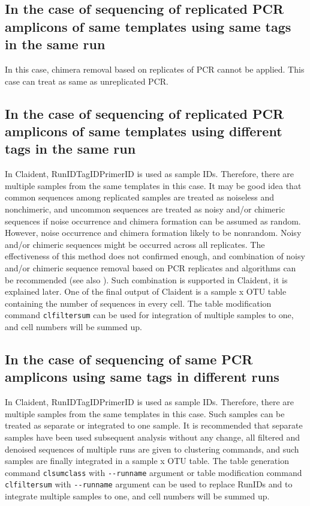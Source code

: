 \documentclass[titlepage,10pt,a4paper,english]{jsbook}
\begin{document}
\subsection{In the case of sequencing of replicated PCR amplicons of same templates using same tags in the same run}

In this case, chimera removal based on replicates of PCR cannot be applied.
This case can treat as same as unreplicated PCR.

\subsection{In the case of sequencing of replicated PCR amplicons of same templates using different tags in the same run}

In Claident, RunID{\textunderscore}{\textunderscore}TagID{\textunderscore}{\textunderscore}PrimerID is used as sample IDs.
Therefore, there are multiple samples from the same templates in this case.
It may be good idea that common sequences among replicated samples are treated as noiseless and nonchimeric, and uncommon sequences are treated as noisy and/or chimeric sequences if noise occurrence and chimera formation can be assumed as random.
However, noise occurrence and chimera formation likely to be nonrandom.
Noisy and/or chimeric sequences might be occurred across all replicates.
The effectiveness of this method does not confirmed enough, and combination of noisy and/or chimeric sequence removal based on PCR replicates and algorithms can be recommended (see also \citet{Lange2015}).
Such combination is supported in Claident, it is explained later.
One of the final output of Claident is a sample x OTU table containing the number of sequences in every cell.
The table modification command \texttt{clfiltersum} can be used for integration of multiple samples to one, and cell numbers will be summed up.

\subsection{In the case of sequencing of same PCR amplicons using same tags in different runs}

In Claident, RunID{\textunderscore}{\textunderscore}TagID{\textunderscore}{\textunderscore}PrimerID is used as sample IDs.
Therefore, there are multiple samples from the same templates in this case.
Such samples can be treated as separate or integrated to one sample.
It is recommended that separate samples have been used subsequent analysis without any change, all filtered and denoised sequences of multiple runs are given to clustering commands, and such samples are finally integrated in a sample x OTU table.
The table generation command \texttt{clsumclass} with \texttt{{-}{-}runname} argument or table modification command \texttt{clfiltersum} with \texttt{{-}{-}runname} argument can be used to replace RunIDs and to integrate multiple samples to one, and cell numbers will be summed up.
\end{document}
